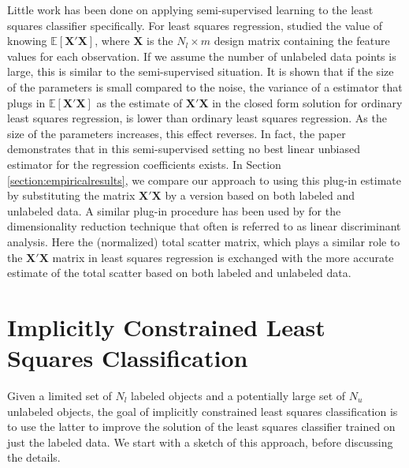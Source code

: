 \documentclass{elsarticle}
\begin{document}
Little work has been done on applying semi-supervised learning to the least squares classifier specifically. 
For least squares regression, \cite{Shaffer1991} studied the value of knowing $\mathbb{E}[\mathbf{X}'\mathbf{X}]$, where $\mathbf{X}$ is the $N_l \times m$ design matrix containing the feature values for each observation. 
If we assume the number of unlabeled data points is large, this is similar to the semi-supervised situation. 
It is shown that if the size of the parameters is small compared to the noise, the variance of a estimator that plugs in $\mathbb{E}[\mathbf{X}'\mathbf{X}]$ as the estimate of $\mathbf{X}'\mathbf{X}$ in the closed form solution for ordinary least squares regression, is lower  than ordinary least squares regression.  
As the size of the parameters increases, this effect reverses. 
In fact, the paper demonstrates that in this semi-supervised setting no best linear unbiased estimator for the regression coefficients exists. 
In Section \ref{section:empiricalresults}, we compare our approach to using this plug-in estimate by substituting the matrix $\mathbf{X}'\mathbf{X}$ by a version based on both labeled and unlabeled data. 
A similar plug-in procedure has been used by \cite{Fan2008} for the dimensionality reduction technique that often is referred to as linear discriminant analysis. Here the (normalized) total scatter matrix, which plays a similar role to the $\mathbf{X}'\mathbf{X}$ matrix in least squares regression is exchanged with the more accurate estimate of the total scatter based on both labeled and unlabeled data.

\section{Implicitly Constrained Least Squares Classification}
\label{section:method}
Given a limited set of $N_l$ labeled objects and a potentially large set of $N_u$ unlabeled objects, the goal of implicitly constrained least squares classification is to use the latter to improve the solution of the least squares classifier trained on just the labeled data. We start with a sketch of this approach, before discussing the details.
\end{document}
